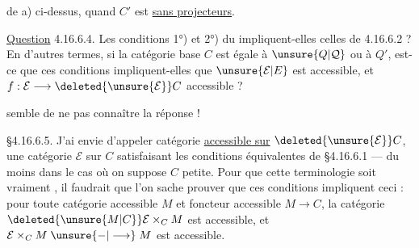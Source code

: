 de a) ci-dessus, quand $C'$ est \uline{sans projecteurs}.

\uline{Question} 4.16.6.4. Les conditions 1°) et 2°) du
 impliquent-elles celles de 4.16.6.2 ?
En d'autres termes, si la catégorie base
$C$ est égale à $\unsure{Q|\mathcal Q}$ ou à $Q'$, est-ce que ces
conditions impliquent-elles que $\unsure{\mathcal E|E}$ est
accessible, et $f:\mathcal E\longrightarrow\deleted{\unsure{\mathcal E}}C$ accessible ?

 semble  de ne pas connaître
la réponse !

\S 4.16.6.5. J'ai envie d'appeler
catégorie \uline{accessible sur} $\deleted{\unsure{\mathcal E}}C$, une catégorie
$\mathcal E$ sur $C$ satisfaisant les conditions
équivalentes de \S 4.16.6.1 --- du moins
dans le cas où on suppose $C$ petite.
Pour que cette terminologie soit vraiment
, il faudrait que l'on
sache prouver que ces conditions impliquent
ceci : pour toute catégorie accessible
$M$ et  foncteur accessible $M\longrightarrow C$,
la catégorie $\deleted{\unsure{M|C}}\mathcal E\times_C M$ est accessible, et
  $\mathcal E\times_C M\mathrel{\unsure{-|\longrightarrow}}M$ est accessible.
